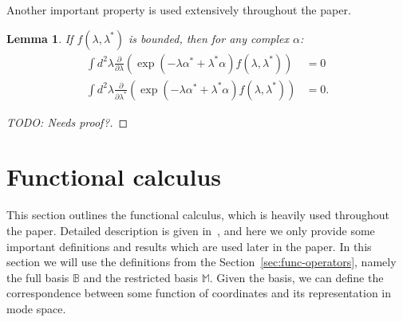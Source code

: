 \documentclass[12pt,aip,jmp,amssymb,amsmath]{revtex4-1}
\newtheorem{lemma}{Lemma}
\begin{document}
Another important property is used extensively throughout the paper.

\begin{lemma}
\label{lmm:c-numbers:zero-integrals}
    If $f(\lambda, \lambda^*)$ is bounded, then for any complex $\alpha$:
    \begin{eqnarray*}
        \int d^2\lambda
            \frac{\partial}{\partial \lambda} \left(
                \exp(-\lambda \alpha^* + \lambda^* \alpha)
                f(\lambda, \lambda^*)
            \right)
        & = 0 \\
        \int d^2\lambda
            \frac{\partial}{\partial \lambda^*}
            \left(
                \exp(-\lambda \alpha^* + \lambda^* \alpha)
                f(\lambda, \lambda^*)
            \right)
        & = 0.
    \end{eqnarray*}
\end{lemma}
\begin{proof}
[TODO: Needs proof?]
\end{proof}



\section{Functional calculus}

This section outlines the functional calculus, which is heavily used throughout the paper.
Detailed description is given in~\cite{Dalton2011}, and here we only provide some important definitions and results which are used later in the paper.
In this section we will use the definitions from the Section~\ref{sec:func-operators}, namely the full basis $\mathbb{B}$ and the restricted basis $\mathbb{M}$.
Given the basis, we can define the correspondence between some function of coordinates and its representation in mode space.
\end{document}
